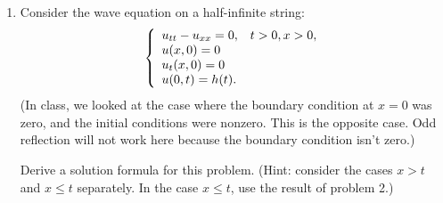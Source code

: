 \documentclass[10pt,a4paper]{report}
\newcommand{\BLUE}[1]{\textcolor{blue}{#1}}
\begin{document}
\begin{enumerate}
\BLUE{
\begin{align*}
	u(x,t) &= F(x+t) + G(x-t)
\end{align*}Let $\alpha = x+t$ and $\beta = x-t$. Then,
\begin{align*}
	u(\alpha, \beta) &= F(\alpha)+G(\beta)
\end{align*}Notice that for sides with slope equal to 1 we have 
\begin{align*}
	m &= 1  & \quad x_1+t_1 & =x_2+t_2 & \quad \alpha_1 &= \alpha_2\\
	 & \quad  & x_3+t_3 &= x_4+t_4 & \quad  \alpha_3&=\alpha_4 \\
	m &= -1  & \quad x_1-t_1 & =x_4-t_4 & \quad \beta_1 &= \beta_4\\
	 & \quad  & x_2-t_2 &= x_3-t_3 & \quad  \beta_2&=\beta_3 
\end{align*}Thus,
\begin{align*}
	u(p_1) &= F(\alpha_1)+G(\beta_1), & \quad u(p_2) &= F(\alpha_1)+G(\beta_2) \\
	u(p_3) &= F(\alpha_3)+G(\beta_2), & \quad u(p_2) &= F(\alpha_3)+G(\beta_1) \\
\end{align*}Then we can see that
\begin{align*}
	u(p_1)+u(p_3) &= F(\alpha_1)+G(\beta_1) + F(\alpha_3)+G(\beta_2) \\
	u(p_2)+ u(p_4) &= F(\alpha_1)+G(\beta_2) + F(\alpha_3)+G(\beta_1)
\end{align*}which are equal.
}

\item Consider the wave equation on a  half-infinite string:
\begin{align*}
	\left \{ \begin{array}{ll} u_{tt}-u_{xx}=0, & t>0,x>0, \\u(x,0)=0\\ u_t(x,0)=0\\u(0,t)=h(t). \end{array} \right .
\end{align*}(In class, we looked at the case where the boundary condition at $x=0$ was zero, and the initial conditions were nonzero.  This is the opposite case.  Odd reflection will not work here because the boundary condition isn't zero.)

Derive a solution formula for this problem.  (Hint: consider the cases $x>t$ and $x\le t$ separately.  In the case $x\le t$, use the result of problem 2.)


\end{enumerate}
\end{document}
